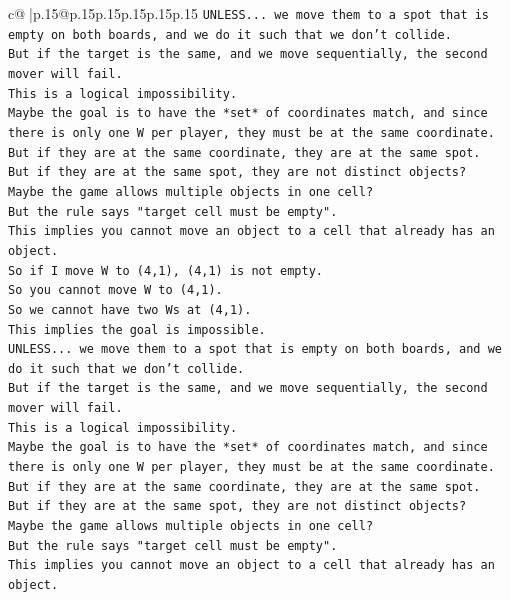 \documentclass{article}
\begin{document}
{\begin{supertabular}{c@{$\;$}|p{.15\linewidth}@{}p{.15\linewidth}p{.15\linewidth}p{.15\linewidth}p{.15\linewidth}p{.15\linewidth}}
{{{\texttt{UNLESS... we move them to a spot that is empty on both boards, and we do it such that we don't collide.} \\
\texttt{But if the target is the same, and we move sequentially, the second mover will fail.} \\
\texttt{This is a logical impossibility.} \\
\texttt{Maybe the goal is to have the *set* of coordinates match, and since there is only one W per player, they must be at the same coordinate.} \\
\texttt{But if they are at the same coordinate, they are at the same spot.} \\
\texttt{But if they are at the same spot, they are not distinct objects?} \\
\texttt{Maybe the game allows multiple objects in one cell?} \\
\texttt{But the rule says "target cell must be empty".} \\
\texttt{This implies you cannot move an object to a cell that already has an object.} \\
\texttt{So if I move W to (4,1), (4,1) is not empty.} \\
\texttt{So you cannot move W to (4,1).} \\
\texttt{So we cannot have two Ws at (4,1).} \\
\texttt{This implies the goal is impossible.} \\
\texttt{UNLESS... we move them to a spot that is empty on both boards, and we do it such that we don't collide.} \\
\texttt{But if the target is the same, and we move sequentially, the second mover will fail.} \\
\texttt{This is a logical impossibility.} \\
\texttt{Maybe the goal is to have the *set* of coordinates match, and since there is only one W per player, they must be at the same coordinate.} \\
\texttt{But if they are at the same coordinate, they are at the same spot.} \\
\texttt{But if they are at the same spot, they are not distinct objects?} \\
\texttt{Maybe the game allows multiple objects in one cell?} \\
\texttt{But the rule says "target cell must be empty".} \\
\texttt{This implies you cannot move an object to a cell that already has an object.} \\
}}}
\end{supertabular}}
\end{document}
